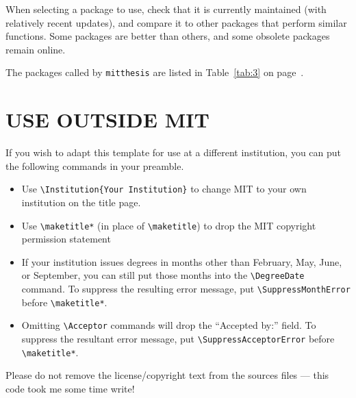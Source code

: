 \documentclass[11pt]{article}
\begin{document}
When selecting a package to use, check that it is currently maintained (with relatively recent updates), and compare it to other packages that perform similar functions.  Some packages are better than others, and some obsolete packages remain online.

The packages called by \texttt{mitthesis} are listed in Table~\ref{tab:3} on page~\pageref{tab:3}.

\section*{USE OUTSIDE MIT}
If you wish to adapt this template for use at a different institution, you can put the following commands in your preamble.  
\begin{itemize}
\item Use \verb|\Institution{Your Institution}| to change MIT to your own institution on the title page. %

\item Use \verb|\maketitle*| (in place of \verb|\maketitle|) to drop the MIT copyright permission statement

\item If your institution issues degrees in months other than February, May, June, or September, you can still put those months into the 
\verb|\DegreeDate| command. To suppress the resulting error message, put \verb|\SuppressMonthError| before \verb|\maketitle*|. %

\item Omitting \verb|\Acceptor| commands will drop the ``Accepted by:'' field. To suppress the resultant error message, put \verb|\SuppressAcceptorError| before \verb|\maketitle*|. %
\end{itemize}
Please do not remove the license/copyright text from the sources files --- this code took me some time write!
\end{document}
